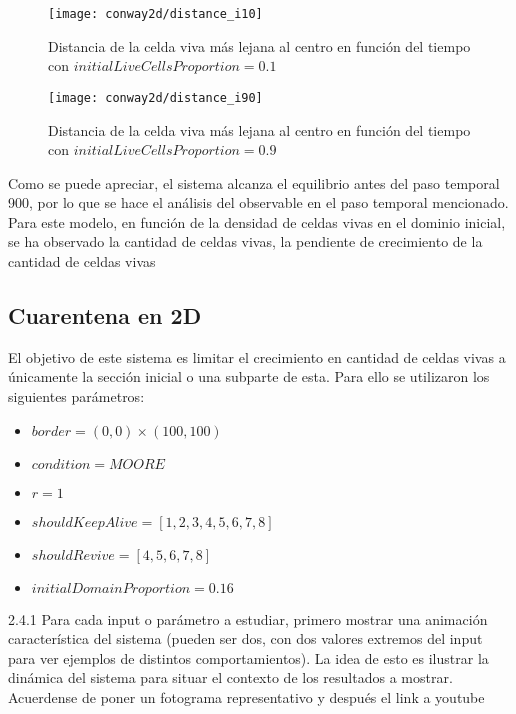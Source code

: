 \begin{figure}[H]
    \centering
    \texttt{[image: conway2d/distance\_i10]}
    \caption{Distancia de la celda viva más lejana al centro en función del tiempo con $initialLiveCellsProportion = 0.1$}
    \label{fig:conway2d_d10}
\end{figure}
\begin{figure}[H]
    \centering
    \texttt{[image: conway2d/distance\_i90]}
    \caption{Distancia de la celda viva más lejana al centro en función del tiempo con $initialLiveCellsProportion = 0.9$}
    \label{fig:conway2d_d90}
\end{figure}

Como se puede apreciar, el sistema alcanza el equilibrio antes del paso temporal 900, por lo que se hace el análisis
del observable en el paso temporal mencionado.
Para este modelo, en función de la densidad de celdas vivas en el dominio inicial, se ha observado la cantidad de celdas vivas,
la pendiente de crecimiento de la cantidad de celdas vivas







\subsection{Cuarentena en 2D}\label{subsec:cuarentena-2D}

El objetivo de este sistema es limitar el crecimiento en cantidad de celdas vivas a únicamente la sección inicial o una subparte de esta. Para ello
se utilizaron los siguientes parámetros:

\begin{itemize}
    \item $border = (0, 0) \times (100, 100)$
    \item $condition = MOORE$
    \item $r = 1$
    \item $shouldKeepAlive = [1, 2, 3, 4, 5, 6, 7, 8]$
    \item $shouldRevive = [4, 5, 6, 7, 8]$
    \item $initialDomainProportion = 0.16$
\end{itemize}

2.4.1 Para cada input o parámetro a estudiar, primero mostrar una animación característica del 
sistema (pueden ser dos, con dos valores extremos del input para ver ejemplos de distintos 
comportamientos). La idea de esto es ilustrar la dinámica del sistema para situar el contexto de los 
resultados a mostrar. Acuerdense de poner un fotograma representativo y después el link a youtube 

